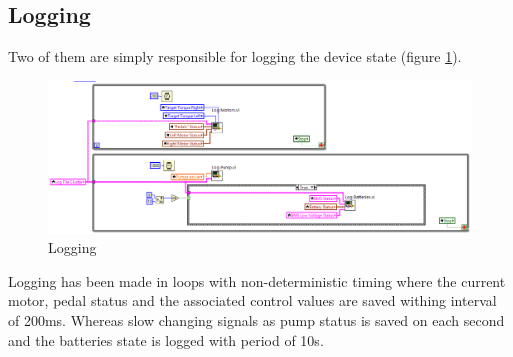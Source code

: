 \subsection{Logging}
Two of them are simply responsible for logging the device state (figure \ref{logging}).
\begin{figure}[H]
    \centering
    \includegraphics[scale=\visc,max width=\textwidth]{figures/Drive_log.png}
    \caption{Logging}
    \label{logging}
\end{figure}
Logging has been made in loops with non-deterministic timing where the current motor, pedal status and the associated control values are saved withing interval of 200ms.
Whereas slow changing signals as pump status is saved on each second and the batteries state is logged with period of 10s.

